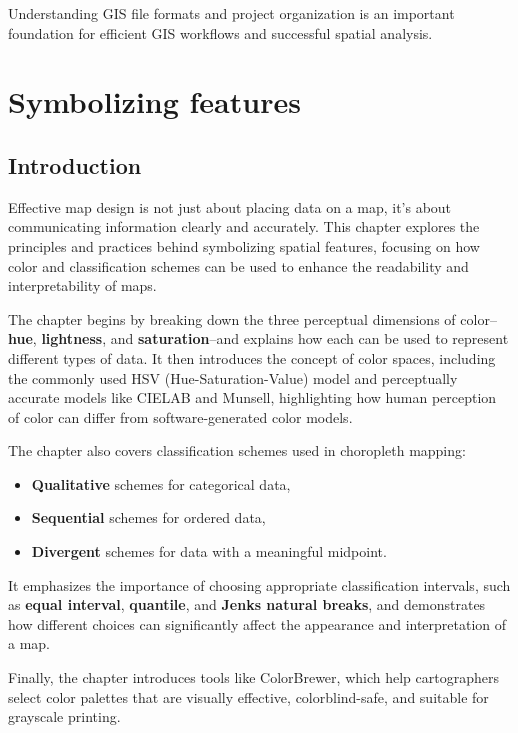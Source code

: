 \documentclass[
  letterpaper,
]{book}
\providecommand{\tightlist}{%
  \setlength{\itemsep}{0pt}\setlength{\parskip}{0pt}}
\begin{document}
Understanding GIS file formats and project organization is an important
foundation for efficient GIS workflows and successful spatial analysis.

\chapter{Symbolizing features}\label{symbolizing-features}

\section{Introduction}\label{introduction-3}

Effective map design is not just about placing data on a map, it's about
communicating information clearly and accurately. This chapter explores
the principles and practices behind symbolizing spatial features,
focusing on how color and classification schemes can be used to enhance
the readability and interpretability of maps.

The chapter begins by breaking down the three perceptual dimensions of
color--\textbf{hue}, \textbf{lightness}, and \textbf{saturation}--and
explains how each can be used to represent different types of data. It
then introduces the concept of color spaces, including the commonly used
HSV (Hue-Saturation-Value) model and perceptually accurate models like
CIELAB and Munsell, highlighting how human perception of color can
differ from software-generated color models.

The chapter also covers classification schemes used in choropleth
mapping:

\begin{itemize}
\tightlist
\item
  \textbf{Qualitative} schemes for categorical data,
\item
  \textbf{Sequential} schemes for ordered data,
\item
  \textbf{Divergent} schemes for data with a meaningful midpoint.
\end{itemize}

It emphasizes the importance of choosing appropriate classification
intervals, such as \textbf{equal interval}, \textbf{quantile}, and
\textbf{Jenks natural breaks}, and demonstrates how different choices
can significantly affect the appearance and interpretation of a map.

Finally, the chapter introduces tools like ColorBrewer, which help
cartographers select color palettes that are visually effective,
colorblind-safe, and suitable for grayscale printing.
\end{document}
